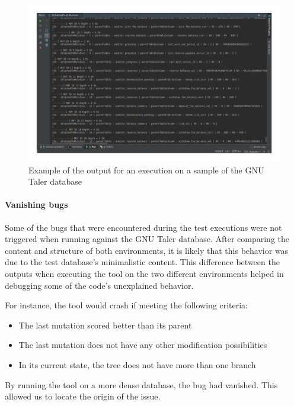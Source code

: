 \documentclass{article}
\begin{document}
\begin{empfile}
\clearpage 		
	
		\bigskip
		\begin{figure} [h!]
			\includegraphics[width=\textwidth]{sc3.png}
			\caption{Example of the output for an execution on a sample of the GNU Taler database}
		\end{figure}
		\bigskip
		
		\paragraph{Vanishing bugs}		
Some of the bugs that were encountered during the test executions were not triggered when running against the GNU Taler database. After comparing the content and structure of both environments, it is likely that this behavior was due to the test database's minimalistic content.
This difference between the outputs when executing the tool on the two different environments helped in debugging some of the code's unexplained behavior. 

For instance, the tool would crash if meeting the following criteria:
	\begin{itemize}
	\item{The last mutation scored better than its parent}
	\item{The last mutation does not have any other modification possibilities}
	\item{In its current state, the tree does not have more than one branch}
	\end{itemize}
	
By running the tool on a more dense database, the bug had vanished. This allowed us to locate the origin of the issue.


\end{empfile}
\end{document}
